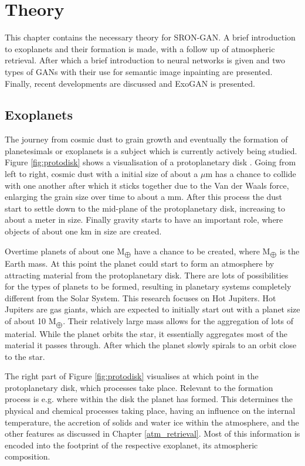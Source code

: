 \chapter{Theory}
This chapter contains the necessary theory for SRON-GAN. A brief introduction to exoplanets and their formation is made, with a follow up of atmospheric retrieval. After which a brief introduction to neural networks is given and two types of GANs with their use for semantic image inpainting are presented. Finally, recent developments are discussed and ExoGAN is presented.

\section{Exoplanets}
The journey from cosmic dust to grain growth and eventually the formation of planetesimals or exoplanets is a subject which is currently actively being studied. Figure \ref{fig:protodisk} shows a visualisation of a protoplanetary disk \cite{henning2013chemistry}. Going from left to right, cosmic dust with a initial size of about a $\mu$m has a chance to collide with one another after which it sticks together due to the Van der Waals force, enlarging the grain size over time to about a mm. After this process the dust start to settle down to the mid-plane of the protoplanetary disk, increasing to about a meter in size. Finally gravity starts to have an important role, where objects of about one km in size are created. 

Overtime planets of about one M$_{\bigoplus}$ have a chance to be created, where M$_{\bigoplus}$ is the Earth mass. At this point the planet could start to form an atmosphere by attracting material from the protoplanetary disk. There are lots of possibilities for the types of planets to be formed, resulting in planetary systems completely different from the Solar System. This research focuses on Hot Jupiters. Hot Jupiters are gas giants, which are expected to initially start out with a planet size of about 10 M$_{\bigoplus}$. Their relatively large mass allows for the aggregation of lots of material. While the planet orbits the star, it essentially aggregates most of the material it passes through. After which the planet slowly spirals to an orbit close to the star.

The right part of Figure \ref{fig:protodisk} visualises at which point in the protoplanetary disk, which processes take place. Relevant to the formation process is e.g. where within the disk the planet has formed. This determines the physical and chemical processes taking place, having an influence on the internal temperature, the accretion of solids and water ice within the atmosphere, and the other features as discussed in Chapter \ref{atm_retrieval}. Most of this information is encoded into the footprint of the respective exoplanet, its atmospheric composition.




